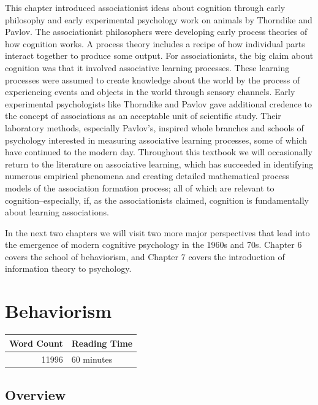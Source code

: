 \documentclass[
  oneside,
  12pt]{crumpbook}
\begin{document}
This chapter introduced associationist ideas about cognition through early philosophy and early experimental psychology work on animals by Thorndike and Pavlov. The associationist philosophers were developing early process theories of how cognition works. A process theory includes a recipe of how individual parts interact together to produce some output. For associationists, the big claim about cognition was that it involved associative learning processes. These learning processes were assumed to create knowledge about the world by the process of experiencing events and objects in the world through sensory channels. Early experimental psychologists like Thorndike and Pavlov gave additional credence to the concept of associations as an acceptable unit of scientific study. Their laboratory methods, especially Pavlov's, inspired whole branches and schools of psychology interested in measuring associative learning processes, some of which have continued to the modern day. Throughout this textbook we will occasionally return to the literature on associative learning, which has succeeded in identifying numerous empirical phenomena and creating detailed mathematical process models of the association formation process; all of which are relevant to cognition--especially, if, as the associationists claimed, cognition is fundamentally about learning associations.

In the next two chapters we will visit two more major perspectives that lead into the emergence of modern cognitive psychology in the 1960s and 70s. Chapter 6 covers the school of behaviorism, and Chapter 7 covers the introduction of information theory to psychology.

\hypertarget{behaviorism}{%
\chapter{Behaviorism}\label{behaviorism}}

\begin{tabular}{r|l}
\hline
Word Count & Reading Time\\
\hline
11996 & 60 minutes\\
\hline
\end{tabular}

\hypertarget{overview}{%
\section{Overview}\label{overview}}
\end{document}
